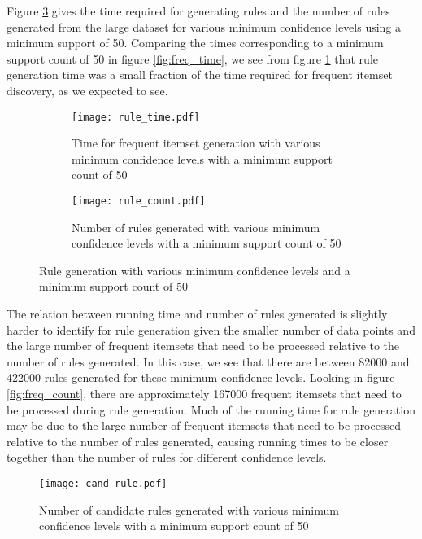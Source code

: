 \documentclass[11pt]{article}
\begin{document}
Figure \ref{fig:rule} gives the time required for generating rules and the number of rules generated from the large dataset for various minimum
confidence levels using a minimum support of 50. Comparing the times corresponding to a minimum support count of 50 in figure \ref{fig:freq_time}, we
see from figure \ref{fig:rule_time} that rule generation time was a small fraction of the time required for frequent itemset discovery, as we expected to
see.

\begin{figure}[h!]
  \centering
  \begin{subfigure}[t]{0.45\textwidth}
    \centering
    \texttt{[image: rule\_time.pdf]}
    \caption{Time for frequent itemset generation with various minimum confidence levels with a minimum support count of 50}
    \label{fig:rule_time}
  \end{subfigure}
  \begin{subfigure}[t]{0.45\textwidth}
    \centering
    \texttt{[image: rule\_count.pdf]}
    \caption{Number of rules generated with various minimum confidence levels with a minimum support count of 50}
    \label{fig:rule_count}
  \end{subfigure}
  \caption{Rule generation with various minimum confidence levels and a minimum support count of 50}
  \label{fig:rule}
\end{figure}

The relation between running time and number of rules generated is slightly harder to identify for rule generation given the smaller number of data points
and the large number of frequent itemsets that need to be processed relative to the number of rules generated. In this case, we see that there
are between 82000 and 422000 rules generated for these minimum confidence levels. Looking in figure \ref{fig:freq_count}, there are approximately
167000 frequent itemsets that need to be processed during rule generation. Much of the running time for rule generation may be due to the large number
of frequent itemsets that need to be processed relative to the number of rules generated, causing running times to be closer together than the number
of rules for different confidence levels.

\begin{wrapfigure}{r}{0.5\textwidth}
  \centering
  \texttt{[image: cand\_rule.pdf]}
  \caption{Number of candidate rules generated with various minimum confidence levels with a minimum support count of 50}
  \label{fig:cand_rule}
\end{wrapfigure}
\end{document}
